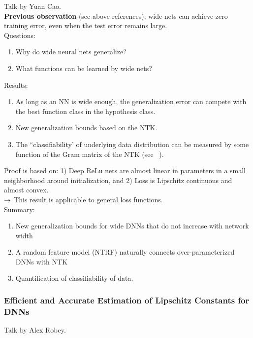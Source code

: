 Talk by Yuan Cao.\\

{\bf Previous observation} (see above references): wide nets can achieve zero training error, even when the test error remains large. \\

Questions:
\begin{enumerate}
    \item Why do wide neural nets generalize?
    \item What functions can be learned by wide nets?
\end{enumerate}

Results:
\begin{enumerate}
    \item As long as an NN is wide enough, the generalization error can compete with the best function class in the hypothesis class.
    \item New generalization bounds based on the NTK.
    \item The ``classifiability' of underlying data distribution can be measured by some function of the Gram matrix of the NTK (see ~\citet{jacot2018neural}).
\end{enumerate}

Proof is based on: 1) Deep ReLu nets are almost linear in parameters in a small neighborhood around initialization, and 2) Loss is Lipschitz continuous and almost convex. \\

$\rightarrow$ This result is applicable to general loss functions. \\

Summary:
\begin{enumerate}
    \item New generalization bounds for wide DNNs that do not increase with network width
    \item A random feature model (NTRF) naturally connects over-parameterized DNNs with NTK
    \item Quantification of classifiability of data.
\end{enumerate}

\spacerule
\subsubsection{Efficient and Accurate Estimation of Lipschitz Constants for DNNs \cite{fazlyab2019efficient}}

Talk by Alex Robey. \\

